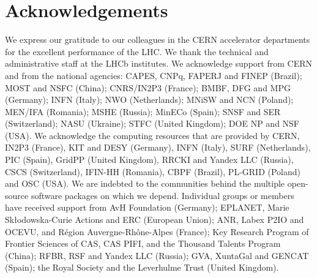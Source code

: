 \documentclass[12pt,a4paper]{article}
\begin{document}
\section*{Acknowledgements}
\noindent 
We express our gratitude to our colleagues in the CERN
accelerator departments for the excellent performance of the LHC. We
thank the technical and administrative staff at the LHCb
institutes. We acknowledge support from CERN and from the national agencies:
CAPES, CNPq, FAPERJ and FINEP (Brazil); 
MOST and NSFC (China); CNRS/IN2P3 (France); 
BMBF, DFG and MPG (Germany); 
INFN (Italy); 
NWO (Netherlands); 
MNiSW and NCN (Poland); 
MEN/IFA (Romania); 
MSHE (Russia); 
MinECo (Spain); 
SNSF and SER (Switzerland); 
NASU (Ukraine); 
STFC (United Kingdom); 
DOE NP and NSF (USA).
We acknowledge the computing resources that are provided by CERN, IN2P3
(France), KIT and DESY (Germany), INFN (Italy), SURF (Netherlands),
PIC (Spain), GridPP (United Kingdom), RRCKI and Yandex
LLC (Russia), CSCS (Switzerland), IFIN-HH (Romania), CBPF (Brazil),
PL-GRID (Poland) and OSC (USA).
We are indebted to the communities behind the multiple open-source
software packages on which we depend.
Individual groups or members have received support from
AvH Foundation (Germany);
EPLANET, Marie Sk\l{}odowska-Curie Actions and ERC (European Union);
ANR, Labex P2IO and OCEVU, and R\'{e}gion Auvergne-Rh\^{o}ne-Alpes (France);
Key Research Program of Frontier Sciences of CAS, CAS PIFI, and the Thousand Talents Program (China);
RFBR, RSF and Yandex LLC (Russia);
GVA, XuntaGal and GENCAT (Spain);
the Royal Society
and the Leverhulme Trust (United Kingdom).

 
\clearpage
\newpage
{}


 
\end{document}
